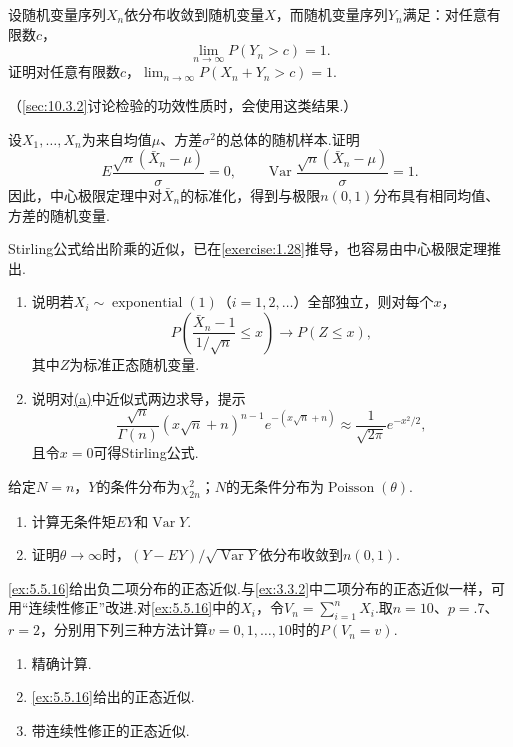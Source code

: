 \begin{exercise}\label{exercise:5.33}
设随机变量序列$X_n$依分布收敛到随机变量$X$，而随机变量序列$Y_n$满足：对任意有限数$c$，
$$\lim_{n\to\infty}P(Y_n>c)=1.$$
证明对任意有限数$c$，$\lim_{n\to\infty}P(X_n+Y_n>c)=1$.

（\autoref{sec:10.3.2}讨论检验的功效性质时，会使用这类结果.）
\end{exercise}
\begin{exercise}\label{exercise:5.34}
设$X_1,\ldots,X_n$为来自均值$\mu$、方差$\sigma^2$的总体的随机样本.证明
$$E\frac{\sqrt n(\bar X_n-\mu)}\sigma=0,\qquad\operatorname{Var}\frac{\sqrt n(\bar X_n-\mu)}\sigma=1.$$
因此，中心极限定理中对$\bar X_n$的标准化，得到与极限$n(0,1)$分布具有相同均值、方差的随机变量.
\end{exercise}
\begin{exercise}\label{exercise:5.35}
Stirling公式给出阶乘的近似，已在\autoref{exercise:1.28}推导，也容易由中心极限定理推出.
\begin{enumerate}[label=(\alph*)]
\item{}\label{itm:exercise:5.35:a} 说明若$X_i\sim\operatorname{exponential}(1)$（$i=1,2,\ldots$）全部独立，则对每个$x$，
$$P\left(\frac{\bar X_n-1}{1/\sqrt n}\le x\right)\to P(Z\le x),$$
其中$Z$为标准正态随机变量.
\item 说明对\hyperref[itm:exercise:5.35:a]{(a)}中近似式两边求导，提示
$$\frac{\sqrt n}{\Gamma(n)}(x\sqrt n+n)^{n-1}e^{-(x\sqrt n+n)}\approx\frac1{\sqrt{2\pi}}e^{-x^2/2},$$
且令$x=0$可得Stirling公式.
\end{enumerate}
\end{exercise}
\begin{exercise}\label{exercise:5.36}
给定$N=n$，$Y$的条件分布为$\chi_{2n}^2$；$N$的无条件分布为$\operatorname{Poisson}(\theta)$.
\begin{enumerate}[label=(\alph*)]\item 计算无条件矩$EY$和$\operatorname{Var}Y$.\item 证明$\theta\to\infty$时，$(Y-EY)/\sqrt{\operatorname{Var}Y}$依分布收敛到$n(0,1)$.\end{enumerate}
\end{exercise}
\begin{exercise}\label{exercise:5.37}
\autoref{ex:5.5.16}给出负二项分布的正态近似.与\autoref{ex:3.3.2}中二项分布的正态近似一样，可用“连续性修正”改进.对\autoref{ex:5.5.16}中的$X_i$，令$V_n=\sum_{i=1}^nX_i$.取$n=10$、$p=.7$、$r=2$，分别用下列三种方法计算$v=0,1,\ldots,10$时的$P(V_n=v)$.
\begin{enumerate}[label=(\alph*)]\item 精确计算.\item \autoref{ex:5.5.16}给出的正态近似.\item 带连续性修正的正态近似.\end{enumerate}
\end{exercise}
